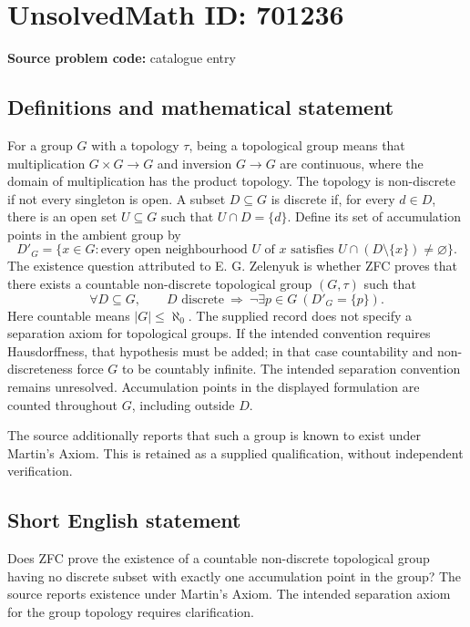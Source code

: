 \documentclass[11pt]{article}
\begin{document}
\section*{UnsolvedMath ID: 701236}
\textbf{Source problem code:} catalogue entry
\subsection{Definitions and mathematical statement}
For a group \(G\) with a topology \(\tau\), being a topological group means that multiplication \(G\times G\to G\) and inversion \(G\to G\) are continuous, where the domain of multiplication has the product topology. The topology is non-discrete if not every singleton is open. A subset \(D\subseteq G\) is discrete if, for every \(d\in D\), there is an open set \(U\subseteq G\) such that \(U\cap D=\{d\}\). Define its set of accumulation points in the ambient group by
\[
D'_G=\{x\in G: \text{every open neighbourhood }U\text{ of }x\text{ satisfies }U\cap(D\setminus\{x\})\ne\varnothing\}.
\]
The existence question attributed to E. G. Zelenyuk is whether ZFC proves that there exists a countable non-discrete topological group \((G,\tau)\) such that
\[
\forall D\subseteq G,\qquad D\text{ discrete}\ \Longrightarrow\ \neg\exists p\in G\ (D'_G=\{p\}).
\]
Here countable means \(|G|\leq\aleph_0\). The supplied record does not specify a separation axiom for topological groups. If the intended convention requires Hausdorffness, that hypothesis must be added; in that case countability and non-discreteness force \(G\) to be countably infinite. The intended separation convention remains unresolved. Accumulation points in the displayed formulation are counted throughout \(G\), including outside \(D\).

The source additionally reports that such a group is known to exist under Martin's Axiom. This is retained as a supplied qualification, without independent verification.
\subsection{Short English statement}
Does ZFC prove the existence of a countable non-discrete topological group having no discrete subset with exactly one accumulation point in the group? The source reports existence under Martin's Axiom. The intended separation axiom for the group topology requires clarification.
\end{document}
